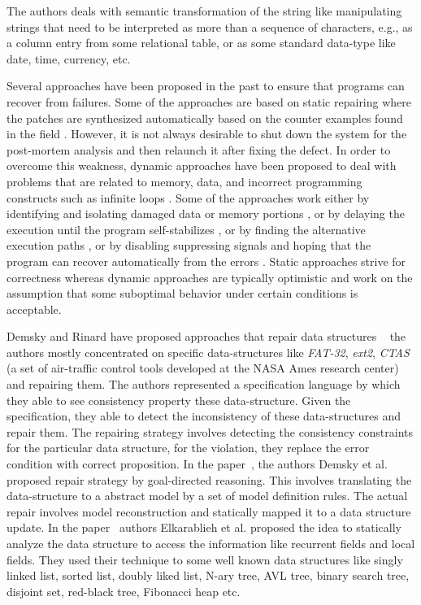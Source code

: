 {The authors deals with semantic transformation of the string like manipulating
strings that need to be interpreted as more than a sequence of characters, e.g.,
as a column entry from some relational table, or as some standard data-type like
date, time, currency, etc.


Several approaches have been proposed in the past to ensure that programs can
recover from failures. Some of the approaches are based on static repairing
where the patches are synthesized automatically based on the counter examples
found in the field \cite{wei-issta-2010}.
However, it is not always desirable to shut down the system for the post-mortem
analysis and then relaunch it after fixing the defect. In order to overcome this
weakness, dynamic approaches have been proposed to deal with problems that are
related to memory, data, and incorrect programming constructs such as infinite
loops \cite{Carbin:2011, KlingMCR12, conf/sosp/PerkinsKLABCPSSSWZER09}. Some of
the approaches work either by identifying and isolating damaged data or memory
portions \cite{conf/issre/DemskyR03, conf/icse/DemskyR05,
conf/issta/DemskyEGMPR06}, or by delaying the execution until the program
self-stabilizes \cite{Eom:2012}, or by finding the alternative execution paths
\cite{PezzeRWZ11}, or by disabling suppressing signals and hoping that the
program can recover automatically from the errors \cite{conf/pldi/LongSR14}.
Static approaches strive for correctness whereas dynamic approaches are
typically optimistic and work on the assumption that some suboptimal behavior
under certain conditions is acceptable.

Demsky and Rinard have proposed approaches that repair data structures ~\cite{
Demsky03automaticdata, conf/issre/DemskyR03,conf/oopsla/DemskyR03,
conf/issta/DemskyEGMPR06} the authors mostly concentrated on specific
data-structures like \emph{FAT-32}, \emph{ext2}, \emph{CTAS} (a set of
air-traffic control tools developed at the NASA Ames research center) and
repairing them. The authors represented a specification language by which they
able to see consistency property these data-structure.
Given the specification, they able to detect the inconsistency of these
data-structures and repair them.
The repairing strategy involves detecting the consistency constraints for the
particular data structure, for the violation, they replace the error condition
with correct proposition. In the paper~\cite{conf/icse/DemskyR05}, the authors
Demsky et al. proposed repair strategy by goal-directed reasoning. This involves
translating the data-structure to a abstract model by a set of model definition
rules. The actual repair involves model reconstruction and statically mapped it
to a data structure update. In the paper~\cite{conf/oopsla/2007} authors
Elkarablieh et al. proposed the idea to statically analyze the data structure to
access the information like recurrent fields and local fields. They used their
technique to some well known data structures like singly linked list, sorted
list, doubly liked list, N-ary tree, AVL tree, binary search tree, disjoint set,
red-black tree, Fibonacci heap etc.

}

